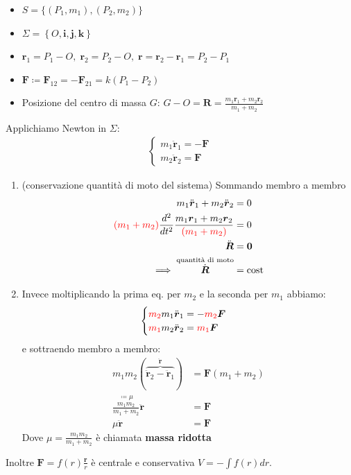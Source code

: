 \documentclass[a4paper,10pt]{article}
\theoremstyle{definition}
\newcommand{\bv}{\boldsymbol} %
\theoremstyle{indentdefinition}
\theoremstyle{indenttheorem}
\theoremstyle{myremark}
\theoremstyle{indentgeneral}
\begin{document}
\begin{itemize}
    \item $S=\{ \left(P_{1},m_{1}\right),\left(P_{2},m_{2}\right)\}$
    \item $\Sigma=\left\{ O,\boldsymbol{i},\boldsymbol{j},\boldsymbol{k}\right\}$
    \item $\bv{r}_1=P_1-O,\;\bv{r}_2=P_2-O,\;\boldsymbol{r}=\boldsymbol{r}_{2}-\boldsymbol{r}_{1}=P_2-P_1$
    \item $\bv{F}\coloneqq\bv{F}_{12}=-\bv{F}_{21}=k\left(P_{1}-P_{2}\right)$
    \item Posizione del centro di massa $G$: $G-O=\boldsymbol{R}=\frac{m_{1}\boldsymbol{r}_{1}+m_{2}\boldsymbol{r}_{2}}{m_{1}+m_{2}}$
\end{itemize}
Applichiamo Newton in $\Sigma$:
\begin{align*}
\begin{cases}
m_{1}\ddot{\boldsymbol{r}}_{1}=-\boldsymbol{F}\\
m_{2}\ddot{\boldsymbol{r}}_{2}=\boldsymbol{F}
\end{cases}
\end{align*}
\begin{enumerate}
    \item (conservazione quantità di moto del sistema) Sommando membro a membro
\begin{align*}
    m_{1}\ddot{\boldsymbol{r}}_{1}+
m_{2}\ddot{\boldsymbol{r}}_{2}&=0 \\
\textcolor{red}{(m_1+m_2)}\frac{d^2}{dt^2}\frac{m_{1}\boldsymbol{r}_{1}+m_{2}\boldsymbol{r}_{2}}{\textcolor{red}{(m_1+m_2)}} &=0\\
 \ddot{\boldsymbol{R}} &=\boldsymbol{0} \\
 \implies \overset{\text{quantità di moto}}{\dot{\boldsymbol{R}}}  &=\text{cost}
\end{align*}
\item Invece moltiplicando la prima eq. per $m_2$ e la seconda per $m_1$ abbiamo:
\begin{align*}
\begin{cases}
\textcolor{red}{m_2}m_{1}\ddot{\boldsymbol{r}}_{1}=-\textcolor{red}{m_2}\boldsymbol{F}\\
\textcolor{red}{m_1}m_{2}\ddot{\boldsymbol{r}}_{2}=\textcolor{red}{m_1}\boldsymbol{F}
\end{cases}
\end{align*}
e sottraendo membro a membro:
\begin{align*}
    m_1m_2(\overbrace{\ddot{\boldsymbol{r}}_{2}-\ddot{\boldsymbol{r}}_{1}}^{\ddot{\bv{r}}})&=\bv{F}(m_1+m_2) \\
    \overset{\coloneqq \mu}{\boxed{\frac{m_1m_2}{m_1+m_2}}}\ddot{\bv{r}} &=\bv{F} \\
    \mu \ddot{\bv{r}} &=\bv{F}
\end{align*}
 Dove $\mu=\frac{m_{1}m_{2}}{m_{1}+m_{2}}$ è chiamata \textbf{massa ridotta}
 \end{enumerate}
Inoltre
$\boldsymbol{F}=f\left(r\right)\frac{\boldsymbol{r}}{r}$ è centrale
e conservativa $V=-\int f\left(r\right)dr$.
\end{document}
